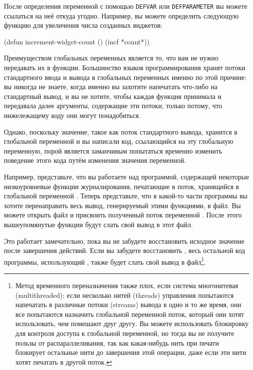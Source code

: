После определения переменной с помощью \lstinline{DEFVAR} или \lstinline{DEFPARAMETER} вы
можете ссылаться на неё откуда угодно. Например, вы можете определить следующую функцию
для увеличения числа созданных виджетов:

\begin{myverb}
  (defun increment-widget-count () (incf *count*))
\end{myverb}

Преимуществом глобальных переменных является то, что вам не нужно передавать их в
функции. Большинство языков программирования хранят потоки стандартного ввода и вывода в
глобальных переменных именно по этой причине: вы никогда не знаете, когда именно вы
захотите напечатать что-либо на стандартный вывод, и вы не хотите, чтобы каждая функция
принимала и передавала далее аргументы, содержащие эти потоки, только потому, что
нижележащему коду они могут понадобиться.

Однако, поскольку значение, такое как поток стандартного вывода, хранится в глобальной
переменной и вы написали код, ссылающийся на эту глобальную переменную, порой является
заманчивым попытаться временно изменить поведение этого кода путём изменения значения
переменной.

Например, представьте, что вы работаете над программой, содержащей некоторые
низкоуровневые функции журналирования, печатающие в поток, хранящийся в глобальной
переменной . Теперь представьте, что в какой-то части программы вы
хотите перенаправить весь вывод, генерируемый этими функциями, в файл. Вы можете открыть
файл и присвоить полученный поток переменной . После этого
вышеупомянутые функции будут слать свой вывод в этот файл.

Это работает замечательно, пока вы не забудете восстановить исходное значение
 после завершения действий. Если вы забудете восстановить
, весь остальной код программы, использующий
, также будет слать свой вывод в файл\footnote{Метод временного
  переназначения  также плох, если система многонитевая
  (multithreaded): если несколько нитей (threads) управления попытаются напечатать в
  различные потоки (streams) вывода в одно и то же время, они все попытаются назначить
  глобальной переменной поток, который они хотят использовать, чем помешают друг другу. Вы
  можете использовать блокировку для контроля доступа к глобальной переменной, но тогда вы
  не получите пользы от распараллеливания, так как какая-нибудь нить при печати блокирует
  остальные нити до завершения этой операции, даже если эти нити хотят печатать в другой
  поток.}.

